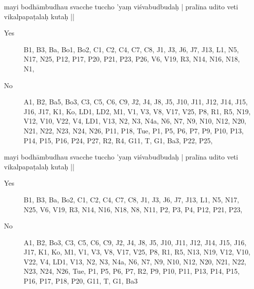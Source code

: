 \begin{ekdosis}
\begin{marma}[hp01_055]
 
mayi bodhāmbudhau svacche tuccho 'yaṃ viśvabudbudaḥ |
pralīna udito veti vikalpapaṭalaḥ kutaḥ ||

 \begin{description}
 \item[Yes] B1, B3, Ba, Bo1, Bo2, C1, C2, C4, C7, C8, J1, J3, J6, J7, J13, L1, N5, N17, N25, P12, P17, P20, P21, P23, P26, V6, V19, R3, N14, N16, N18, N1, 

 \item[No] A1, B2, Ba5, Bo3, C3, C5, C6, C9, J2, J4, J8, J5, J10, J11, J12, J14, J15, J16, J17, K1, Ko, LD1, LD2, M1, V1, V3, V8, V17, V25, P8, R1, R5, N19, V12, V10, V22, V4, LD1, V13, N2, N3, N4a, N6, N7, N9, N10, N12, N20, N21, N22, N23, N24, N26, P11, P18, Tue, P1, P5, P6, P7, P9, P10, P13, P14, P15, P16, P24, P27, R2, R4, G11, T, G1, Ba3, P22, P25, 
    \end{description}

 
mayi bodhāmbudhau svacche tuccho 'yaṃ viśvabudbudaḥ |
pralīna udito veti vikalpapaṭalaḥ kutaḥ ||

\begin{description}
\item[Yes] B1, B3, Ba, Bo2, C1, C2, C4, C7, C8, J1, J3, J6, J7, J13, L1, N5, N17, N25, V6, V19, R3, N14, N16, N18, N8, N11, P2, P3, P4, P12, P21, P23, 
\item[No] A1, B2, Bo3, C3, C5, C6, C9, J2, J4, J8, J5, J10, J11, J12, J14, J15, J16, J17, K1, Ko, M1, V1, V3, V8, V17, V25, P8, R1, R5, N13, N19, V12, V10, V22, V4, LD1, V13, N2, N3, N4a, N6, N7, N9, N10, N12, N20, N21, N22, N23, N24, N26, Tue, P1, P5, P6, P7, R2, P9, P10, P11, P13, P14, P15, P16, P17, P18, P20, G11, T, G1, Ba3
    \end{description}



\end{marma}
\end{ekdosis}
